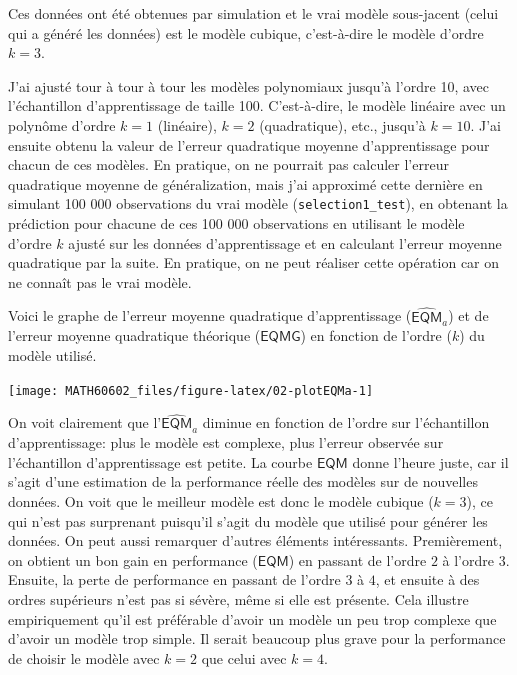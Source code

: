 \documentclass[
  11pt,
  letterpaper,
]{book}
\theoremstyle{definition}
\theoremstyle{definition}
\theoremstyle{definition}
\theoremstyle{definition}
\theoremstyle{remark}
\begin{document}
Ces données ont été obtenues par simulation et le vrai modèle sous-jacent (celui qui a généré les données) est le modèle cubique, c'est-à-dire le modèle d'ordre \(k=3\).

J'ai ajusté tour à tour à tour les modèles polynomiaux jusqu'à l'ordre 10, avec l'échantillon d'apprentissage de taille 100. C'est-à-dire, le modèle linéaire avec un polynôme d'ordre \(k=1\) (linéaire), \(k=2\) (quadratique), etc., jusqu'à \(k=10\). J'ai ensuite obtenu la valeur de l'erreur quadratique moyenne d'apprentissage pour chacun de ces modèles. En pratique, on ne pourrait pas calculer l'erreur quadratique moyenne de généralization, mais j'ai approximé cette dernière en simulant 100 000 observations du vrai modèle (\texttt{selection1\_test}), en obtenant la prédiction pour chacune de ces 100 000 observations en utilisant le modèle d'ordre \(k\) ajusté sur les données d'apprentissage et en calculant l'erreur moyenne quadratique par la suite. En pratique, on ne peut réaliser cette opération car on ne connaît pas le vrai modèle.

Voici le graphe de l'erreur moyenne quadratique d'apprentissage (\(\widehat{\mathsf{EQM}}_a\)) et de l'erreur moyenne quadratique théorique (\(\mathsf{EQMG}\)) en fonction de l'ordre (\(k\)) du modèle utilisé.

\begin{center}\texttt{[image: MATH60602\_files/figure-latex/02-plotEQMa-1]} \end{center}

On voit clairement que l'\(\widehat{\mathsf{EQM}}_a\) diminue en fonction de l'ordre sur l'échantillon d'apprentissage: plus le modèle est complexe, plus l'erreur observée sur l'échantillon d'apprentissage est petite. La courbe \(\mathsf{EQM}\) donne l'heure juste, car il s'agit d'une estimation de la performance réelle des modèles sur de nouvelles données. On voit que le meilleur modèle est donc le modèle cubique (\(k=3\)), ce qui n'est pas surprenant puisqu'il s'agit du modèle que utilisé pour générer les données. On peut aussi remarquer d'autres éléments intéressants. Premièrement, on obtient un bon gain en performance (\(\mathsf{EQM}\)) en passant de l'ordre \(2\) à l'ordre \(3\). Ensuite, la perte de performance en passant de l'ordre \(3\) à \(4\), et ensuite à des ordres supérieurs n'est pas si sévère, même si elle est présente. Cela illustre empiriquement qu'il est préférable d'avoir un modèle un peu trop complexe que d'avoir un modèle trop simple. Il serait beaucoup plus grave pour la performance de choisir le modèle avec \(k=2\) que celui avec \(k=4\).
\end{document}
